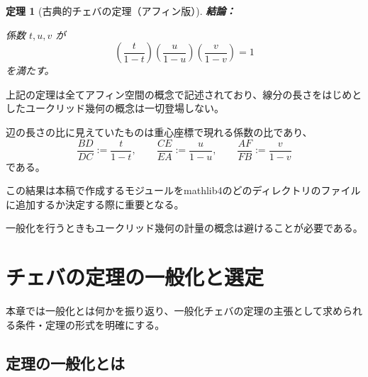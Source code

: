 \documentclass[a4paper,12pt]{bxjsbook}
\newlength{\customindent}
\newenvironment{body}{
  \par
  \begingroup
  \setlength{\leftskip}{\customindent}
  \setlength{\rightskip}{0pt}
  \setlength{\parindent}{1em}
  \setlength{\displayindent}{\customindent}
  \setlength{\displaywidth}{\dimexpr\linewidth-\customindent\relax}
}{
  \par
  \endgroup
}
\theoremstyle{theorem}
\newtheorem{theorem}{定理}[chapter]
\begin{document}
\begin{theorem}[古典的チェバの定理（アフィン版）]
        \noindent\textbf{結論：}\par
        \begin{theoremenumerate}[label=(\roman*), leftmargin=4em, topsep=2pt, partopsep=0pt, itemsep=0pt, parsep=0pt]
          \item 係数 $t,u,v$ が
          \[
            \left(\frac{t}{1-t}\right)\left(\frac{u}{1-u}\right)\left(\frac{v}{1-v}\right)=1
          \]
          を満たす。
        \end{theoremenumerate}
      
    \end{theorem}

    \begin{body}

        \indent 上記の定理は全てアフィン空間の概念で記述されており、線分の長さをはじめとしたユークリッド幾何の概念は一切登場しない。

        \indent 辺の長さの比に見えていたものは重心座標で現れる係数の比であり、
        \[
            \dfrac{BD}{DC} := \dfrac{t}{1-t},\qquad
            \dfrac{CE}{EA} := \dfrac{u}{1-u},\qquad
            \dfrac{AF}{FB} := \dfrac{v}{1-v}
        \]
        である。

        \indent この結果は本稿で作成するモジュールをmathlib4のどのディレクトリのファイルに追加するか決定する際に重要となる。

        \indent 一般化を行うときもユークリッド幾何の計量の概念は避けることが必要である。

    \end{body}

    \chapter{チェバの定理の一般化と選定}
    \begin{body}
        \indent 本章では一般化とは何かを振り返り、一般化チェバの定理の主張として求められる条件・定理の形式を明確にする。
    \end{body}

    \section{定理の一般化とは}
\end{document}
